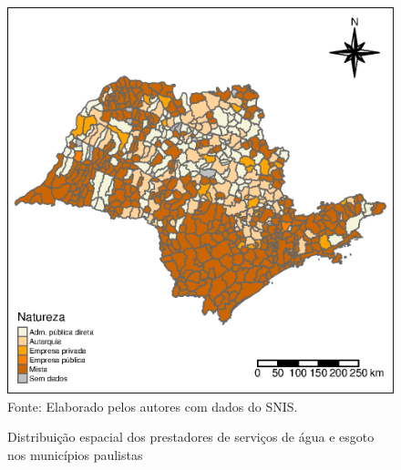 \begin{figure}[H]
        \centering
        	\begin{minipage}{0.6\textwidth}	
                \caption{Distribuição espacial dos prestadores de serviços de água e esgoto nos municípios paulistas}
                \includegraphics[scale=0.8]{figures/m1.eps}                 
            	\footnotesize \\
            		Fonte: Elaborado pelos autores com dados do SNIS.
    	\label{f:maps15}
	\end{minipage}
\end{figure}


